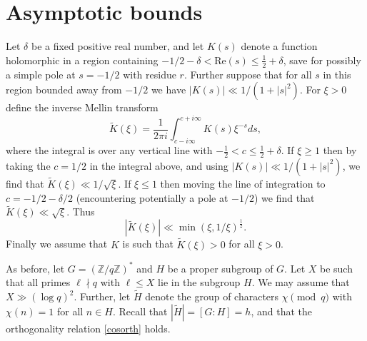 \documentclass [12pt]{amsart}
\numberwithin{equation}{section}
\begin{document}
 
\section{Asymptotic bounds} 

\noindent  Let  $\delta$ be a fixed positive real number, and 
let $K(s)$ denote a function holomorphic in a 
region containing $-1/2 - \delta <  \text{Re}(s) \le \frac 12+\delta$, save for possibly a simple pole at $s = -1/2$ with residue $r$.
 Further suppose that for all $s$ in this region bounded away from $-1/2$ we have 
$|K(s)|\ll 1/(1+|s|^2)$. 
For $\xi >0$ define the inverse Mellin transform 
$$ 
{\widetilde K}(\xi) = \frac{1}{2\pi i} \int_{c-i\infty}^{c+i\infty} K(s) \xi^{-s} ds,
$$ 
where the integral is over any vertical line with $-\frac 12 < c\leq \frac 12 + \delta$.  If $\xi \ge 1$ then by taking the $c=1/2$ in 
the integral above, and using $|K(s)|\ll 1/(1+|s|^2)$, we find that ${\widetilde K}(\xi) \ll 1/\sqrt{\xi}$.  If $\xi\le 1$ then moving the line of integration to $c=-1/2-\delta/2$ (encountering potentially a pole at $-1/2$) we find that ${\widetilde K}(\xi) \ll \sqrt{\xi}$.    Thus 
\begin{equation} 
\label{6.1}
|{\widetilde K}(\xi)| \ll \min( \xi,1/\xi)^{\frac 12}.
\end{equation} 
Finally we assume that $K$ is such that ${\widetilde K}(\xi) >0$ for all $\xi >0$. 


As before, let $G = (\mathbb{Z}/q\mathbb{Z})^*$ and $H$ be a proper subgroup of $G$.  Let $X$ be such that all primes $\ell \nmid q$ with $\ell \le X$ lie in the 
subgroup $H$.  We may assume that $X \gg (\log q)^2$.   Further, let ${\tilde H}$ denote the group of characters 
 $\chi \pmod q$ with $\chi(n)=1$ for all $n\in H$.   Recall that $|\tilde H|=
 [G:H]=h$, and that  the orthogonality relation \eqref{cosorth} holds.  
 
\end{document}
